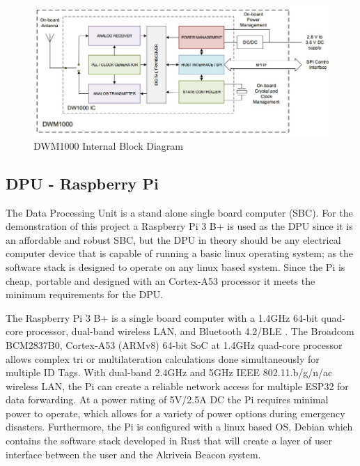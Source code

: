 \medskip
\begin{figure}[H]
\centering
    \includegraphics[scale=0.7]{./images/dwm1000_bd.jpg}
    \caption{DWM1000 Internal Block Diagram}
    \label{dwm1000_bd}
\end{figure}



\pagebreak
\subsection{DPU - Raspberry Pi}
\medskip
The Data Processing Unit is a stand alone single board computer (SBC). For the demonstration of this project a Raspberry Pi 3 B+ is used as the DPU since it is an affordable and robust SBC, but the DPU in theory should be any electrical computer device that is capable of running a basic linux operating system; as the software stack is designed to operate on any linux based system. Since the Pi is cheap, portable and designed with an Cortex-A53 processor it meets the minimum requirements for the DPU.

\bigskip
The Raspberry Pi 3 B+ is a single board computer with a 1.4GHz 64-bit quad-core processor, dual-band wireless LAN, and Bluetooth 4.2/BLE \cite{R3-3-1}. The Broadcom BCM2837B0, Cortex-A53 (ARMv8) 64-bit SoC at 1.4GHz quad-core processor allows complex tri or multilateration calculations done simultaneously for multiple ID Tags. With dual-band 2.4GHz and 5GHz IEEE 802.11.b/g/n/ac wireless LAN, the Pi can create a reliable network access for multiple ESP32 for data forwarding. At a power rating of 5V/2.5A DC the Pi requires minimal power to operate, which allows for a variety of power options during emergency disasters. Furthermore, the Pi is configured with a linux based OS, Debian which contains the software stack developed in Rust that will create a layer of user interface between the user and the Akriveia Beacon system.


